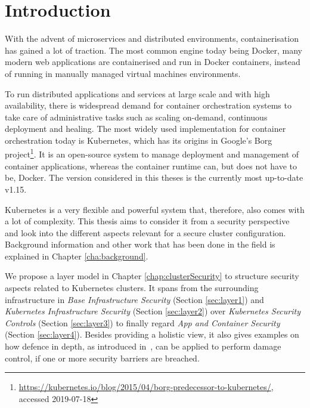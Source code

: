 
\chapter{Introduction}


With the advent of microservices and distributed environments, containerisation has gained a lot of traction. The most common engine today being Docker, many modern web applications are containerised and run in Docker containers, instead of running in manually managed virtual machines environments. 

To run distributed applications and services at large scale and with high availability, there is widespread demand for container orchestration systems to take care of administrative tasks such as scaling on-demand, continuous deployment and healing. The most widely used implementation for container orchestration today is Kubernetes, which has its origins in Google’s Borg project\footnote{\url{https://kubernetes.io/blog/2015/04/borg-predecessor-to-kubernetes/}, accessed 2019-07-18}. It is an open-source system to manage deployment and management of container applications, whereas the container runtime can, but does not have to be, Docker. The version considered in this theses is the currently most up-to-date v1.15.

Kubernetes is a very flexible and powerful system that, therefore, also comes with a lot of complexity. This thesis aims to consider it from a security perspective and look into the different aspects relevant for a secure cluster configuration. Background information and other work that has been done in the field is explained in Chapter \ref{cha:background}.

We propose a layer model in Chapter \ref{chap:clusterSecurity} to structure security aspects related to Kubernetes clusters. It spans from the surrounding infrastructure in \textit{Base Infrastructure Security} (Section \ref{sec:layer1}) and \textit{Kubernetes Infrastructure Security} (Section \ref{sec:layer2}) over \textit{Kubernetes Security Controls} (Section \ref{sec:layer3}) to finally regard \textit{App and Container Security} (Section \ref{sec:layer4}). Besides providing a holistic view, it also gives examples on how defence in depth, as introduced in~\textcite{defenceInDepth}, can be applied to perform damage control, if one or more security barriers are breached.

